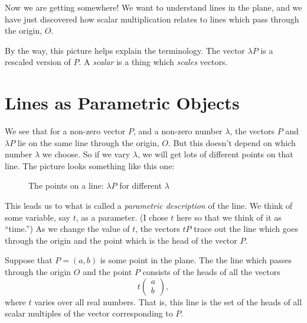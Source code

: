 \documentclass[00-livre-main.tex]{subfiles}
\begin{document}
Now we are getting somewhere! We want to understand lines in the plane, and we have just discovered how scalar multiplication relates to lines which pass through the origin, $O$.

By the way, this picture helps explain the terminology. The vector $\lambda P$ is a rescaled version of $P$. A \emph{scalar} is a thing which \emph{scales} vectors.

\section*{Lines as Parametric Objects}

We see that for a non-zero vector $P$, and a non-zero number $\lambda$, the vectors $P$ and $\lambda P$ lie on the same line through the origin, $O$. But this doesn't depend on which number $\lambda$ we choose. So if we vary $\lambda$, we will get lots of different points on that line.
The picture looks something like this one:
\begin{figure}[h!]
\centering
{}
\caption{The points on a line: $\lambda P$ for different $\lambda$}
\label{fig:line-scalar}
\end{figure}

This leads us to what is called a \emph{parametric description} of the line.
We think of some variable, say $t$, as a parameter.
(I chose $t$ here so that we think of it as ``time.'')
As we change the value of $t$, the vectors $tP$ trace out the line which goes through the origin and the point which is the head of the vector $P$.

\begin{theorem} \label{thm:param-line-origin}
Suppose that $P=(a,b)$ is some point in the plane. The the line which passes through the origin $O$ and the point $P$ consists of the heads of all the vectors 
\[
t \begin{pmatrix} a \\ b \end{pmatrix},
\]
where $t$ varies over all real numbers. That is, this line is the set of the heads of all scalar multiples of the vector corresponding to $P$.
\end{theorem}
\end{document}
